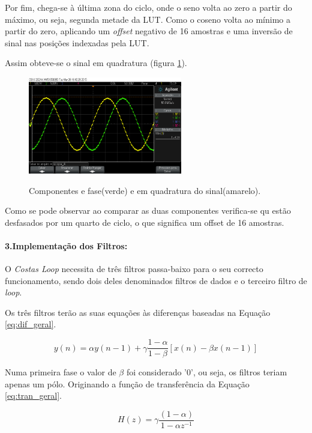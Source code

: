 \documentclass[11pt]{article}
\numberwithin{equation}{section}
\begin{document}
	Por fim, chega-se à última zona do ciclo, onde o seno volta ao zero a partir do máximo, ou seja, segunda metade da LUT. Como o coseno volta ao mínimo a partir do zero, aplicando um \textit{offset} negativo de 16 amostras e uma inversão de sinal nas posições indexadas pela LUT.
	
	Assim obteve-se o sinal em quadratura (figura \ref{quad}).
	\begin{figure}[h]
		\centering     
		\includegraphics[width=0.6\textwidth]{./quadratura}~\\
		\caption{Componentes e fase(verde) e em quadratura do sinal(amarelo).}
		\label{quad}
	\end{figure}
	
	Como se pode observar ao comparar as duas componentes verifica-se qu estão desfasados por um quarto de ciclo, o que significa um offset de 16 amostras.
	\paragraph{3.Implementação dos Filtros:} \hspace{0pt}   \label{para:P3-3}       
	
	O \textit{Costas Loop} necessita de três filtros passa-baixo para o seu correcto funcionamento, sendo dois deles denominados filtros de dados e o terceiro filtro de \textit{loop}.
	
	Os três filtros terão as suas equações às diferenças baseadas na Equação \ref{eq:dif_geral}.
	
	\begin{equation}
	y(n)=\alpha y(n-1) + \gamma \frac{1-\alpha}{1-\beta}[x(n)-\beta x(n-1)]
	\label{eq:dif_geral}
	\end{equation}
	
	Numa primeira fase o valor de $ \beta $ foi considerado '0', ou seja, os filtros teriam apenas um pólo. Originando a função de transferência da Equação \ref{eq:tran_geral}.
	
	\begin{equation}
	H(z)=\gamma\frac{(1-\alpha)}{1-\alpha z^{-1}}
	\label{eq:tran_geral}
	\end{equation}
	
\end{document}
